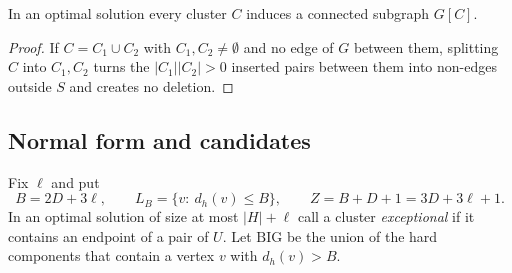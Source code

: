 \begin{lemma}\label{lem:conn}
In an optimal solution every cluster $C$ induces a connected subgraph $G[C]$.
\end{lemma}
\begin{proof}
If $C=C_1\cup C_2$ with $C_1,C_2\neq\emptyset$ and no edge of $G$ between them, splitting $C$ into $C_1,C_2$ turns the $|C_1||C_2|>0$ inserted pairs between them into non-edges outside $S$ and creates no deletion.
\end{proof}

\subsection{Normal form and candidates}
Fix $\ell$ and put
\[
B=2D+3\ell,\qquad L_B=\{v:\ d_h(v)\le B\},\qquad Z=B+D+1=3D+3\ell+1.
\]
In an optimal solution of size at most $|H|+\ell$ call a cluster \emph{exceptional} if it contains an endpoint of a pair of $U$. Let $\mathrm{BIG}$ be the union of the hard components that contain a vertex $v$ with $d_h(v)>B$.

